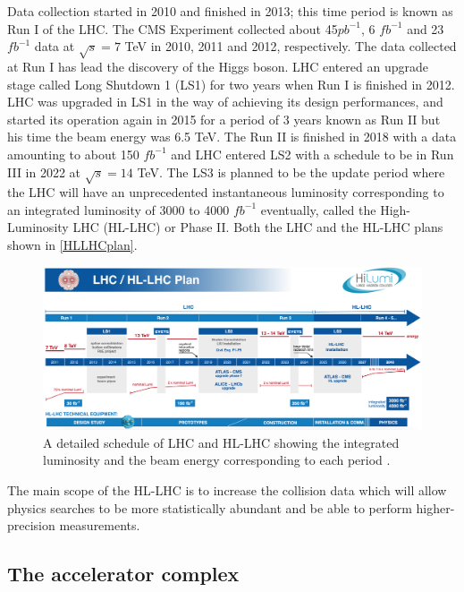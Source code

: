 Data collection started in 2010 and finished in 2013; this time period is known as Run I of the LHC. The CMS Experiment collected about 45$pb^{-1}$, 6 $fb^{-1}$ and 23 $fb^{-1}$ data at $\sqrt{s}=7$ TeV in 2010, 2011 and 2012, respectively. The data collected at Run I has lead the discovery of the Higgs boson. LHC entered an upgrade stage called Long Shutdown 1 (LS1) for two years when Run I is finished in 2012. LHC was upgraded in LS1 in the way of achieving its design performances, and started its operation again in 2015 for a period of 3 years known as Run II but his time the beam energy was 6.5 TeV. The Run II is finished in 2018 with a data amounting to about 150 $fb^{-1}$ and LHC entered LS2 with a schedule to be in Run III in 2022 at $\sqrt{s}=14$ TeV. The LS3 is planned to be the update period where the LHC will have an unprecedented instantaneous luminosity corresponding to an integrated luminosity of 3000 to 4000 $fb^{-1}$ eventually, called the High-Luminosity LHC (HL-LHC) or Phase II. Both the LHC and the HL-LHC plans shown in \autoref{HLLHCplan}.

\begin{figure}[ht]
	\centering
	\includegraphics[width=\textwidth]{MSc_Thesis/fig/HLLHCplan.png}
	\vspace{2mm}
	\caption[A detailed schedule of LHC and HL-LHC showing the integrated luminosity and the beam energy corresponding to each period.]
	{A detailed schedule of LHC and HL-LHC showing the integrated luminosity and the beam energy corresponding to each period \cite{Apollinari:2284929}.}
	\label{HLLHCplan}
\end{figure}

The main scope of the HL-LHC is to increase the collision data which will allow physics searches to be more statistically abundant and be able to perform higher-precision measurements.

\subsection{The accelerator complex}

